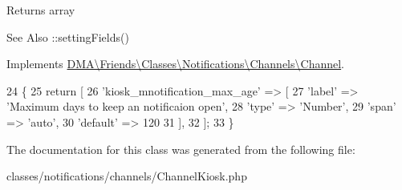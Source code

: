 \begin{DoxyReturn}{Returns}
array
\end{DoxyReturn}
 \begin{DoxySeeAlso}{See Also}
\-::setting\-Fields() 
\end{DoxySeeAlso}


Implements \hyperlink{interfaceDMA_1_1Friends_1_1Classes_1_1Notifications_1_1Channels_1_1Channel_aa473115fa58a6fa5f57a9069f23dd771}{D\-M\-A\textbackslash{}\-Friends\textbackslash{}\-Classes\textbackslash{}\-Notifications\textbackslash{}\-Channels\textbackslash{}\-Channel}.


\begin{DoxyCode}
24     \{
25         \textcolor{keywordflow}{return} [
26             \textcolor{stringliteral}{'kiosk\_mnotification\_max\_age'} => [
27                 \textcolor{stringliteral}{'label'} => \textcolor{stringliteral}{'Maximum days to keep an notificaion open'},
28                 \textcolor{stringliteral}{'type'}  => \textcolor{stringliteral}{'Number'},
29                 \textcolor{stringliteral}{'span'}  => \textcolor{stringliteral}{'auto'},
30                 \textcolor{stringliteral}{'default'} => 120
31             ],
32         ];
33     \}
\end{DoxyCode}


The documentation for this class was generated from the following file\-:\begin{DoxyCompactItemize}
\item 
classes/notifications/channels/Channel\-Kiosk.\-php\end{DoxyCompactItemize}

